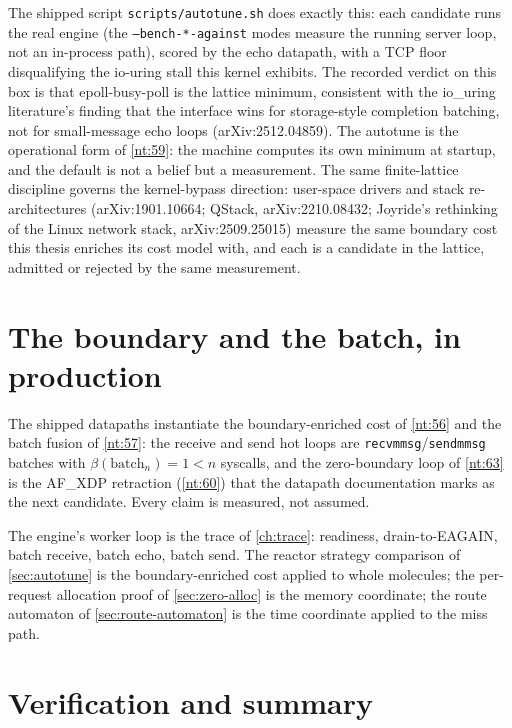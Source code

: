The shipped script \texttt{scripts/autotune.sh} does exactly this: each
candidate runs the real engine (the \texttt{--bench-*-against} modes
measure the running server loop, not an in-process path), scored by the
echo datapath, with a TCP floor disqualifying the io-uring stall this
kernel exhibits. The recorded verdict on this box is that
epoll-busy-poll is the lattice minimum, consistent with the io\_uring
literature's finding that the interface wins for storage-style
completion batching, not for small-message echo loops
(arXiv:2512.04859). The autotune is the operational form of
\autoref{nt:59}: the machine computes its own minimum at startup, and
the default is not a belief but a measurement. The same finite-lattice
discipline governs the kernel-bypass direction: user-space drivers and
stack re-architectures (arXiv:1901.10664; QStack, arXiv:2210.08432;
Joyride's rethinking of the Linux network stack, arXiv:2509.25015)
measure the same boundary cost this thesis enriches its cost model with,
and each is a candidate in the lattice, admitted or rejected by the same
measurement.

\section{The boundary and the batch, in production}\label{sec:boundary-batch}

\begin{theorem}\label{nt:70}
The shipped datapaths instantiate the boundary-enriched cost of
\autoref{nt:56} and the batch fusion of \autoref{nt:57}: the receive and
send hot loops are \texttt{recvmmsg}/\texttt{sendmmsg} batches with
$\beta(\mathrm{batch}_n) = 1 < n$ syscalls, and the zero-boundary loop of
\autoref{nt:63} is the AF\_XDP retraction (\autoref{nt:60}) that the
datapath documentation marks as the next candidate. Every claim is
measured, not assumed.
\end{theorem}

The engine's worker loop is the trace of \autoref{ch:trace}: readiness,
drain-to-EAGAIN, batch receive, batch echo, batch send. The reactor
strategy comparison of \autoref{sec:autotune} is the boundary-enriched
cost applied to whole molecules; the per-request allocation proof of
\autoref{sec:zero-alloc} is the memory coordinate; the route automaton
of \autoref{sec:route-automaton} is the time coordinate applied to the
miss path.

\section{Verification and summary}\label{sec:applied-verify}

